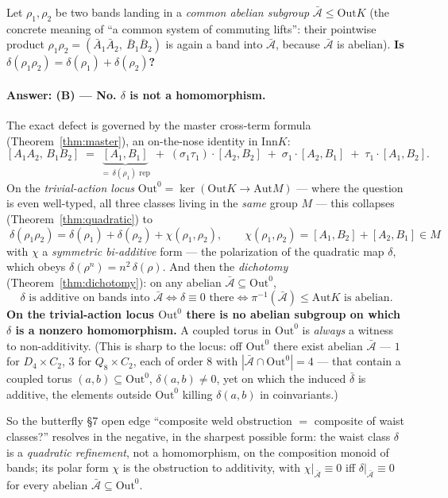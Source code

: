 \documentclass[11pt]{article}
\theoremstyle{definition}
\newcommand{\Aut}{\mathrm{Aut}}
\newcommand{\Inn}{\mathrm{Inn}}
\newcommand{\Out}{\mathrm{Out}}
\newcommand{\Ab}{\bar{\mathcal{A}}}
\begin{document}
Let $\rho_1,\rho_2$ be two bands landing in a \emph{common abelian subgroup}
$\Ab\le\Out K$ (the concrete meaning of ``a common system of commuting lifts'': their
pointwise product $\rho_1\rho_2=(\bar A_1\bar A_2,\ \bar B_1\bar B_2)$ is again a band
into $\Ab$, because $\Ab$ is abelian). \textbf{Is
$\delta(\rho_1\rho_2)=\delta(\rho_1)+\delta(\rho_2)$?}

\paragraph{Answer: (B) --- No. $\delta$ is not a homomorphism.}
The exact defect is governed by the master cross-term formula
(Theorem~\ref{thm:master}), an on-the-nose identity in $\Inn K$:
\[
[A_1A_2,\,B_1B_2]\;=\;\underbrace{[A_1,B_1]}_{=\,\delta(\rho_1)\text{ rep}}
\;+\;(\sigma_1\tau_1)\!\cdot\![A_2,B_2]\;+\;\sigma_1\!\cdot\![A_2,B_1]\;+\;\tau_1\!\cdot\![A_1,B_2].
\]
On the \emph{trivial-action locus}
$\Out^0=\ker(\Out K\to\Aut M)$ --- where the question is even well-typed, all three
classes living in the \emph{same} group $M$ --- this collapses
(Theorem~\ref{thm:quadratic}) to
\[
\boxed{\;\delta(\rho_1\rho_2)=\delta(\rho_1)+\delta(\rho_2)+\chi(\rho_1,\rho_2),\qquad
\chi(\rho_1,\rho_2)=[A_1,B_2]+[A_2,B_1]\in M\;}
\]
with $\chi$ a \emph{symmetric bi-additive} form --- the polarization of the quadratic
map $\delta$, which obeys $\delta(\rho^n)=n^2\,\delta(\rho)$. And then the
\emph{dichotomy} (Theorem~\ref{thm:dichotomy}): on any abelian $\Ab\subseteq\Out^0$,
\[
\delta\text{ is additive on bands into }\Ab\iff\delta\equiv0\text{ there}\iff
\pi^{-1}(\Ab)\le\Aut K\text{ is abelian}.
\]
\textbf{On the trivial-action locus $\Out^0$ there is no abelian subgroup on which
$\delta$ is a nonzero homomorphism.} A coupled torus in $\Out^0$ is \emph{always} a
witness to non-additivity. (This is sharp to the locus: off $\Out^0$ there exist abelian
$\Ab$ --- $1$ for $D_4\times C_2$, $3$ for $Q_8\times C_2$, each of order $8$ with
$|\Ab\cap\Out^0|=4$ --- that contain a coupled torus $(a,b)\subseteq\Out^0$,
$\delta(a,b)\neq0$, yet on which the induced $\bar\delta$ is additive, the elements
outside $\Out^0$ killing $\delta(a,b)$ in coinvariants.)

So the butterfly \S7 open edge ``composite weld obstruction $=$ composite of waist
classes?'' resolves in the negative, in the sharpest possible form: the waist class
$\delta$ is a \emph{quadratic refinement}, not a homomorphism, on the composition
monoid of bands; its polar form $\chi$ is the obstruction to additivity, with
$\chi|_{\Ab}\equiv0$ iff $\delta|_{\Ab}\equiv0$ for every abelian $\Ab\subseteq\Out^0$.
\end{document}
